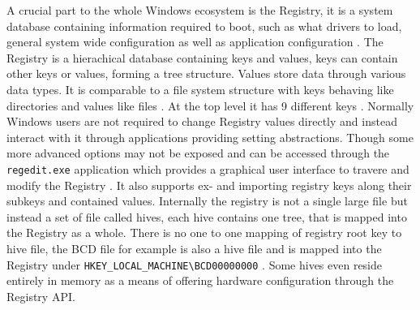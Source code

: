 A crucial part to the whole Windows ecosystem is the Registry, it is a system database containing information required to boot, such as what drivers to load, general system wide configuration as well as application configuration \cite[Section 1]{windows-internals-7-part1}.
The Registry is a hierachical database containing keys and values, keys can contain other keys or values, forming a tree structure.
Values store data through various data types.
It is comparable to a file system structure with keys behaving like directories and values like files \cite[Section 10]{windows-internals-7-part2}.
At the top level it has 9 different keys \cite[Section 10]{windows-internals-7-part2}.
Normally Windows users are not required to change Registry values directly and instead interact with it through applications providing setting abstractions.
Though some more advanced options may not be exposed and can be accessed through the \lstinline{regedit.exe} application which provides a graphical user interface to travere and modify the Registry \cite[Section 10]{windows-internals-7-part2}.
It also supports ex- and importing registry keys along their subkeys and contained values.
Internally the registry is not a single large file but instead a set of file called hives, each hive contains one tree, that is mapped into the Registry as a whole.
There is no one to one mapping of registry root key to hive file, the \ac{BCD} file for example is also a hive file and is mapped into the Registry under \lstinline{HKEY_LOCAL_MACHINE\BCD00000000} \cite[Section 10]{windows-internals-7-part2}.
Some hives even reside entirely in memory as a means of offering hardware configuration through the Registry \ac{API}.

